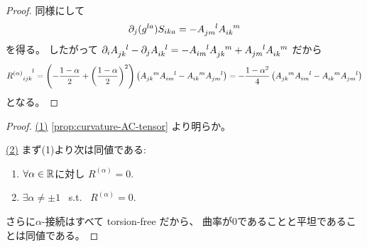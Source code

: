 \documentclass[report]{jlreq}
\begin{document}
\begin{proof}
    同様にして
    \begin{equation}
        \partial_j (g^{la})
            S_{ika}
                =
                    -
                    A_{jm}^{\hphantom{jm}l}
                    A_{ik}^{\hphantom{ik}m}
    \end{equation}
    を得る。
    したがって
    $\partial_i A_{jk}^{\hphantom{jk}l} - \partial_j A_{ik}^{\hphantom{ik}l}
        =
            - A_{im}^{\hphantom{im}l} A_{jk}^{\hphantom{jk}m}
            + A_{jm}^{\hphantom{jm}l} A_{ik}^{\hphantom{ik}m}$
    だから
    \begin{equation}
        {R^{(\alpha)}}_{ijk}^{\hphantom{ijk}l}
            =
                \left({
                    - \frac{1 - \alpha}{2}
                    + \left({\frac{1 - \alpha}{2}}\right)^2
                }\right)
                \left({
                    A_{jk}^{\hphantom{jk}m} A_{im}^{\hphantom{im}l}
                    - A_{ik}^{\hphantom{ik}m} A_{jm}^{\hphantom{jm}l}
                }\right)
            =
                -
                \frac{1 - \alpha^2}{4}
                \left({
                    A_{jk}^{\hphantom{jk}m} A_{im}^{\hphantom{im}l}
                    - A_{ik}^{\hphantom{ik}m} A_{jm}^{\hphantom{jm}l}
                }\right)
    \end{equation}
    となる。
\end{proof}


\begin{proof}
    \uline{(1)} \quad
    \cref{prop:curvature-AC-tensor}
    より明らか。

    \uline{(2)} \quad
    まず(1)より次は同値である:
    \begin{enumerate}[label=(\alph*)']
        \item $\forall \alpha \in \mathbb{R}$に対し
            $R^{(\alpha)} = 0$.
        \item $\exists \alpha \neq \pm 1$
            \, s.t. \,
            $R^{(\alpha)} = 0$.
    \end{enumerate}
    さらに$\alpha$-接続はすべて torsion-free だから、
    曲率が$0$であることと平坦であることは同値である。
\end{proof}
\end{document}
